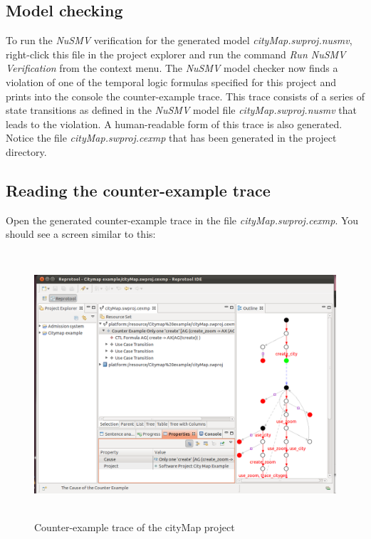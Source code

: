 
\subsection{Model checking}
To run the \emph{NuSMV} verification for the generated model \emph{cityMap.swproj.nusmv}, right-click this file in the project explorer
and run the command \emph{Run NuSMV Verification} from the context menu. The \emph{NuSMV} model checker now finds a violation of one of
the temporal logic formulas specified for this project and prints into the console the counter-example trace. This trace consists of
a series of state transitions as defined in the \emph{NuSMV} model file \emph{cityMap.swproj.nusmv} that leads to the violation.
A human-readable form of this trace is also generated. Notice the file \emph{cityMap.swproj.cexmp} that has been generated in the project
directory.

\subsection{Reading the counter-example trace}
Open the generated counter-example trace in the file \emph{cityMap.swproj.cexmp}. You should see a screen similar to this:

\begin{figure}[ht]
  \centering
  \includegraphics[height=280pt]{images/reprotoolTraceCityMap}
  \caption{Counter-example trace of the cityMap project}
  \label{fig:reprotoolTraceCityMap}
\end{figure}

